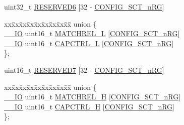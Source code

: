 \begin{DoxyCompactItemize}
\begin{tabbing}
\end{tabbing}\item 
uint32\+\_\+t \hyperlink{struct_l_p_c___s_c_t___t_a6153367d38a8160ce681b7891f202714}{R\+E\+S\+E\+R\+V\+E\+D6} \mbox{[}32 -\/ \hyperlink{group___s_c_t__18_x_x__43_x_x_ga8d80e251208a01483a6b00c81ecb7493}{C\+O\+N\+F\+I\+G\+\_\+\+S\+C\+T\+\_\+n\+RG}\mbox{]}
\item 
\begin{tabbing}
xx\=xx\=xx\=xx\=xx\=xx\=xx\=xx\=xx\=\kill
union \{\\
\>\hyperlink{core__sc300_8h_aec43007d9998a0a0e01faede4133d6be}{\_\_IO} uint16\_t \hyperlink{struct_l_p_c___s_c_t___t_a277ca1931d44b5339f7ac4d583fca0d7}{MATCHREL\_L} \mbox{[}\hyperlink{group___s_c_t__18_x_x__43_x_x_ga8d80e251208a01483a6b00c81ecb7493}{CONFIG\_SCT\_nRG}\mbox{]}\\
\>\hyperlink{core__sc300_8h_aec43007d9998a0a0e01faede4133d6be}{\_\_IO} uint16\_t \hyperlink{struct_l_p_c___s_c_t___t_a476a3e974b4e00de2123dfcba1ca2328}{CAPCTRL\_L} \mbox{[}\hyperlink{group___s_c_t__18_x_x__43_x_x_ga8d80e251208a01483a6b00c81ecb7493}{CONFIG\_SCT\_nRG}\mbox{]}\\
\}; \\

\end{tabbing}\item 
uint16\+\_\+t \hyperlink{struct_l_p_c___s_c_t___t_a65a3744046115228c56e66a850204280}{R\+E\+S\+E\+R\+V\+E\+D7} \mbox{[}32 -\/ \hyperlink{group___s_c_t__18_x_x__43_x_x_ga8d80e251208a01483a6b00c81ecb7493}{C\+O\+N\+F\+I\+G\+\_\+\+S\+C\+T\+\_\+n\+RG}\mbox{]}
\item 
\begin{tabbing}
xx\=xx\=xx\=xx\=xx\=xx\=xx\=xx\=xx\=\kill
union \{\\
\>\hyperlink{core__sc300_8h_aec43007d9998a0a0e01faede4133d6be}{\_\_IO} uint16\_t \hyperlink{struct_l_p_c___s_c_t___t_ae656adbda24743a452538b6e776ca44d}{MATCHREL\_H} \mbox{[}\hyperlink{group___s_c_t__18_x_x__43_x_x_ga8d80e251208a01483a6b00c81ecb7493}{CONFIG\_SCT\_nRG}\mbox{]}\\
\>\hyperlink{core__sc300_8h_aec43007d9998a0a0e01faede4133d6be}{\_\_IO} uint16\_t \hyperlink{struct_l_p_c___s_c_t___t_afcf9a05939cf2ef2f6b1e56ca401498d}{CAPCTRL\_H} \mbox{[}\hyperlink{group___s_c_t__18_x_x__43_x_x_ga8d80e251208a01483a6b00c81ecb7493}{CONFIG\_SCT\_nRG}\mbox{]}\\
\}; \\


\end{tabbing}
\end{DoxyCompactItemize}
